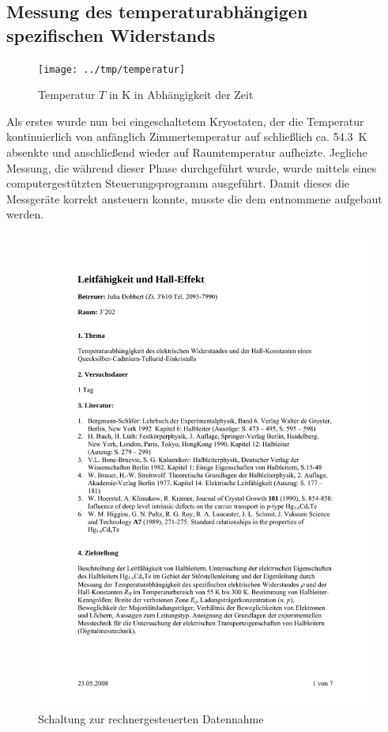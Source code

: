 \subsection{Messung des temperaturabhängigen spezifischen Widerstands}

\begin{figure}[htb]
   \centering
   \texttt{[image: ../tmp/temperatur]}
   \caption{Temperatur $T$ in K in Abhängigkeit der Zeit}
   \label{fig:temp}
\end{figure}

Als erstes wurde nun bei eingeschaltetem Kryostaten, der die Temperatur
kontinuierlich von anfänglich Zimmertemperatur auf schließlich ca.
\SI{54,3}{\kelvin} absenkte und anschließend wieder auf Raumtemperatur
aufheizte. Jegliche Messung, die während dieser Phase durchgeführt wurde, wurde
mittels eines computergestützten Steuerungsprogramm ausgeführt. Damit dieses
die Messgeräte korrekt ansteuern konnte, musste die dem \cite{script} entnommene
 aufgebaut werden.

\begin{figure}[htb]
 \centering
 \includegraphics[page=6,viewport=70 395 525 705,clip,width=\columnwidth,keepaspectratio]{../docs/Anleitung_Hall.pdf}
 \caption{Schaltung zur rechnergesteuerten Datennahme}
 \label{fig:Schaltung}
\end{figure}

